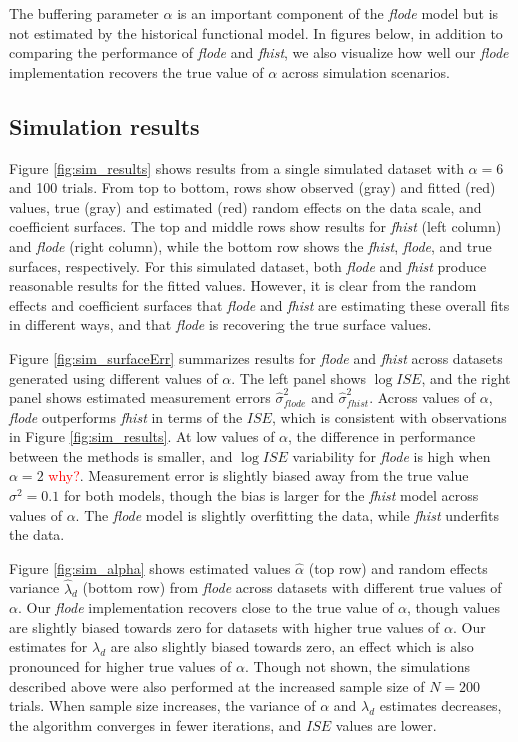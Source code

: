 \documentclass[preprint]{JASA}
\begin{document}
The buffering parameter \(\alpha\) is an important component of the
\emph{flode} model but is not estimated by the historical functional
model. In figures below, in addition to comparing the performance of
\emph{flode} and \emph{fhist}, we also visualize how well our
\emph{flode} implementation recovers the true value of \(\alpha\) across
simulation scenarios.

\hypertarget{simulation-results}{%
\subsection{Simulation results}\label{simulation-results}}

Figure \ref{fig:sim_results} shows results from a single simulated
dataset with \(\alpha = 6\) and 100 trials. From top to bottom, rows
show observed (gray) and fitted (red) values, true (gray) and estimated
(red) random effects on the data scale, and coefficient surfaces. The
top and middle rows show results for \emph{fhist} (left column) and
\emph{flode} (right column), while the bottom row shows the
\emph{fhist}, \emph{flode}, and true surfaces, respectively. For this
simulated dataset, both \emph{flode} and \emph{fhist} produce reasonable
results for the fitted values. However, it is clear from the random
effects and coefficient surfaces that \emph{flode} and \emph{fhist} are
estimating these overall fits in different ways, and that \emph{flode}
is recovering the true surface values.

Figure \ref{fig:sim_surfaceErr} summarizes results for \emph{flode} and
\emph{fhist} across datasets generated using different values of
\(\alpha\). The left panel shows \(\log ISE\), and the right panel shows
estimated measurement errors \(\widehat{\sigma}^2_{flode}\) and
\(\widehat{\sigma}^2_{fhist}\). Across values of \(\alpha\),
\emph{flode} outperforms \emph{fhist} in terms of the \(ISE\), which is
consistent with observations in Figure \ref{fig:sim_results}. At low
values of \(\alpha\), the difference in performance between the methods
is smaller, and \(\log ISE\) variability for \emph{flode} is high when
\(\alpha = 2\) \textcolor{red}{why?}. Measurement error is slightly
biased away from the true value \(\sigma^2 = 0.1\) for both models,
though the bias is larger for the \emph{fhist} model across values of
\(\alpha\). The \emph{flode} model is slightly overfitting the data,
while \emph{fhist} underfits the data.

Figure \ref{fig:sim_alpha} shows estimated values \(\widehat{\alpha}\)
(top row) and random effects variance \(\widehat{\lambda}_d\) (bottom
row) from \emph{flode} across datasets with different true values of
\(\alpha\). Our \emph{flode} implementation recovers close to the true
value of \(\alpha\), though values are slightly biased towards zero for
datasets with higher true values of \(\alpha\). Our estimates for
\(\lambda_d\) are also slightly biased towards zero, an effect which is
also pronounced for higher true values of \(\alpha\). Though not shown,
the simulations described above were also performed at the increased
sample size of \(N = 200\) trials. When sample size increases, the
variance of \(\alpha\) and \(\lambda_d\) estimates decreases, the
algorithm converges in fewer iterations, and \(ISE\) values are lower.
\end{document}

